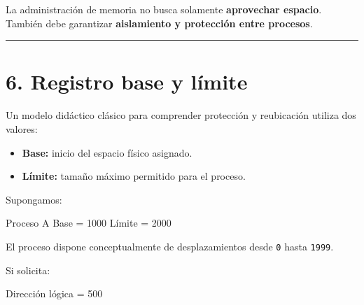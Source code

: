 \documentclass[
  spanish,
  letterpaper,
]{scrbook}
\newenvironment{Shaded}{\begin{snugshade}}{\end{snugshade}}
\newcommand{\NormalTok}[1]{\textcolor[rgb]{0.00,0.23,0.31}{#1}}
\providecommand{\tightlist}{%
  \setlength{\itemsep}{0pt}\setlength{\parskip}{0pt}}
\begin{document}
\begin{tcolorbox}[enhanced jigsaw, arc=.35mm, bottomrule=.15mm, bottomtitle=1mm, breakable, colback=white, colbacktitle=quarto-callout-warning-color!10!white, colframe=quarto-callout-warning-color-frame, coltitle=black, left=2mm, leftrule=.75mm, opacityback=0, opacitybacktitle=0.6, rightrule=.15mm, title=\textcolor{quarto-callout-warning-color}{\faExclamationTriangle}\hspace{0.5em}{Idea fundamental}, titlerule=0mm, toprule=.15mm, toptitle=1mm]

La administración de memoria no busca solamente \textbf{aprovechar
espacio}. También debe garantizar \textbf{aislamiento y protección entre
procesos}.

\end{tcolorbox}

\begin{center}\rule{0.5\linewidth}{0.5pt}\end{center}


\chapter{6. Registro base y límite}\label{registro-base-y-luxedmite}

Un modelo didáctico clásico para comprender protección y reubicación
utiliza dos valores:

\begin{itemize}
\tightlist
\item
  \textbf{Base:} inicio del espacio físico asignado.
\item
  \textbf{Límite:} tamaño máximo permitido para el proceso.
\end{itemize}

Supongamos:

\begin{Shaded}
\begin{Highlighting}[]
\NormalTok{Proceso A}
\NormalTok{Base   = 1000}
\NormalTok{Límite = 2000}
\end{Highlighting}
\end{Shaded}

El proceso dispone conceptualmente de desplazamientos desde \texttt{0}
hasta \texttt{1999}.

Si solicita:

\begin{Shaded}
\begin{Highlighting}[]
\NormalTok{Dirección lógica = 500}
\end{Highlighting}
\end{Shaded}
\end{document}
